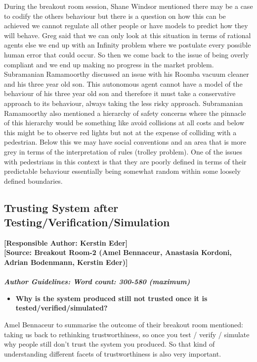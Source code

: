 \documentclass[sigconf]{acmart}
\begin{document}
During the breakout room session, Shane Windsor mentioned there may be a case to codify the others behaviour but there is a question on how this can be achieved we cannot regulate all other people or have models to predict how they will behave. 
Greg said that we can only look at this situation in terms of rational agents else we end up with an Infinity problem where we postulate every possible human error that could occur. 
So then we come back to the issue of being overly compliant and we end up making no progress in the market problem. 
Subramanian Ramamoorthy discussed an issue with his Roomba vacuum cleaner and his three year old son. 
This autonomous agent cannot have a model of the behaviour of his three year old son and therefore it must take a conservative approach to its behaviour, always taking the less risky approach. 
Subramanian Ramamoorthy also mentioned a hierarchy of safety concerns where the pinnacle of this hierarchy would be something like avoid collisions at all costs and below this might be to observe red lights but not at the expense of colliding with a pedestrian. Below this we may have social conventions and an area that is more grey in terms of the interpretation of rules (trolley problem). 
One of the issues with pedestrians in this context is that they are poorly defined in terms of their predictable behaviour essentially being somewhat random within some loosely defined boundaries. 

\subsection{Trusting System after Testing/Verification/Simulation}
\noindent\textbf{[Responsible Author:  Kerstin Eder]}\\
\noindent \textbf{[Source: Breakout Room-2 (Amel Bennaceur, Anastasia Kordoni, Adrian Bodenmann, Kerstin Eder)]}\\\\
\noindent\textbf{\textit{Author Guidelines: Word count: 300-580 (maximum)}}\\
\begin{itemize}
	\item \textbf{Why is the system produced still not trusted once it is tested/verified/simulated?}
\end{itemize}
Amel Bennaceur to summarise the outcome of their breakout room mentioned: taking us back to rethinking trustworthiness, so once you test / verify / simulate why people still don't trust the system you produced. So that kind of understanding different facets of trustworthiness is also very important. 
\end{document}
